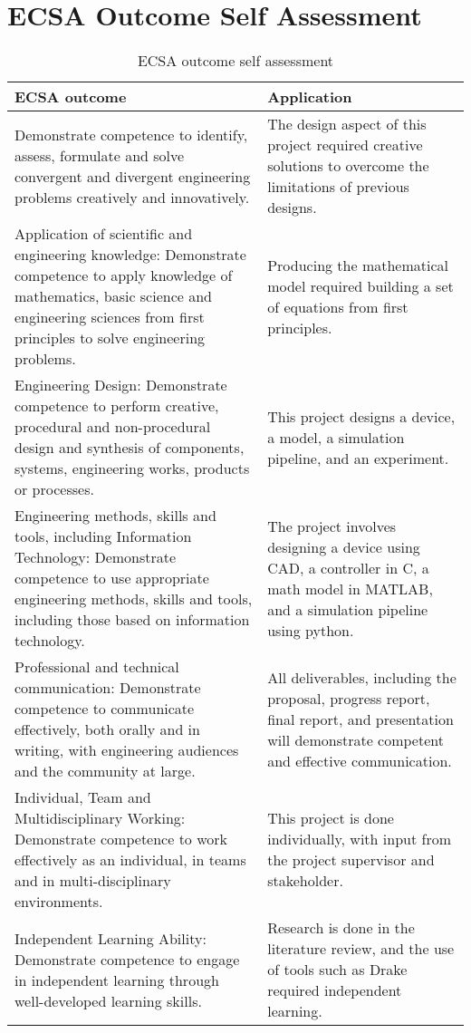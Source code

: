 \chapter{ECSA Outcome Self Assessment}

\begin{table}[h]
	\caption{ECSA outcome self assessment}
	\footnotesize
	\begin{tabular}{ | p{22em} | p{17em} |} 
		\hline
		ECSA outcome& Application \\ 
		\hline
		Demonstrate competence to identify, assess, formulate and solve convergent and
		divergent engineering problems creatively and innovatively. & 
		The design aspect of this project required creative solutions to overcome the limitations of previous designs. \\ 
		\hline
		Application of scientific and engineering knowledge: Demonstrate competence to apply knowledge
		of mathematics, basic science and engineering sciences from first principles to solve engineering problems. & 
		Producing the mathematical model required building a set of equations from first principles. \\ 
		\hline
		Engineering Design: Demonstrate competence to perform creative, procedural and non-procedural design and synthesis of components, systems, engineering works, products or processes.& This project designs a device, a model, a simulation pipeline, and an experiment. \\ 
		\hline
		Engineering methods, skills and tools, including Information Technology: Demonstrate competence
		to use appropriate engineering methods, skills and tools, including those based on information technology. & 
		The project involves designing a device using CAD, a controller in C, a math model in MATLAB, and a simulation pipeline using python.\\ 
		\hline
		Professional and technical communication: Demonstrate competence to communicate effectively,
		both orally and in writing, with engineering audiences and the community at large. & 
		All deliverables, including the proposal, progress report, final report, and presentation will demonstrate competent and effective communication. \\ 
		\hline
		Individual, Team and Multidisciplinary Working: Demonstrate competence to work effectively as an
		individual, in teams and in multi-disciplinary environments. & 
		This project is done individually, with input from the project supervisor and stakeholder. \\ 
		\hline
		Independent Learning Ability: Demonstrate competence to engage in independent learning through
		well-developed learning skills. & 
		Research is done in the literature review, and the use of tools such as Drake required independent learning. \\ 
		\hline
	\end{tabular}
\end{table}